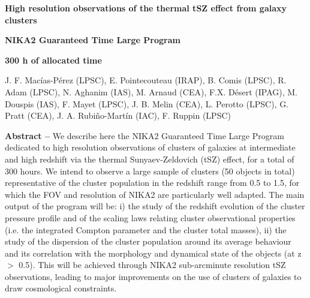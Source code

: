 \documentclass[11pt,a4paper,twoside,graphicx,color]{article}
\begin{document}
%
%
\begin{center}{\huge \bf
High resolution observations of the thermal tSZ effect from galaxy clusters
}\end{center}
% 
\begin{center}
{\bf NIKA2 Guaranteed Time Large Program}

{\bf 300 h of allocated time}
\end{center}

\begin{center}
J. F. Mac\'ias-P\'erez (LPSC), E. Pointecouteau (IRAP), B. Comis (LPSC), R. Adam (LPSC), N. Aghanim (IAS), M. Arnaud (CEA), F.X. D\'esert (IPAG), M. Douspis (IAS), F. Mayet (LPSC), J. B. Melin (CEA), L. Perotto (LPSC), G. Pratt (CEA), J. A. Rubi\~no-Mart\'in (IAC), F. Ruppin (LPSC)
\end{center}

\vspace{-0.3cm}
{\bf \Large Abstract -- } 
We describe here the NIKA2 Guaranteed Time Large Program dedicated to high resolution observations of clusters of galaxies at intermediate and high redshift via the thermal Sunyaev-Zeldovich (tSZ) effect, for a total of 300 hours. %
We intend to observe a large sample of clusters (50 objects in total) representative of the cluster population in the redshift range from 0.5 to 1.5, for which the FOV and resolution of NIKA2 are particularly well adapted. The main output of the program will be: i) the study of the redshift evolution of the cluster pressure profile and of the scaling laws relating cluster observational properties (i.e. the integrated Compton parameter and the cluster total masses), ii) the study of the dispersion of the cluster population around its average behaviour and its correlation with the morphology and dynamical state of the objects (at z $>$ 0.5). This will be achieved through NIKA2 sub-arcminute resolution tSZ observations, leading to major improvements on the use of clusters of galaxies to draw cosmological constraints.\\
\end{document}
